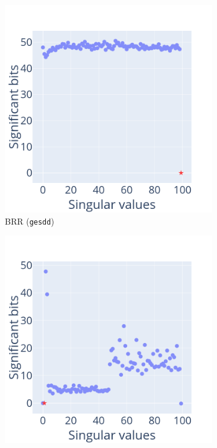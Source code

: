 \documentclass[10pt,journal,compsoc]{IEEEtran}
\begin{document}
\begin{figure}
    \centering
    \begin{subfigure}{0.49\linewidth}
        \includegraphics[width=\linewidth]{figure/BRR_singular_values.png}
        \caption{BRR (\texttt{gesdd})}
        \label{fig:BRR_svd}
    \end{subfigure}
    \begin{subfigure}{0.49\linewidth}
        \includegraphics[width=\linewidth]{figure/OLS_singular_values.png}

\end{subfigure}
\end{figure}
\end{document}
